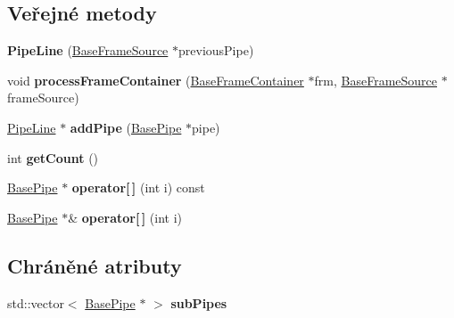 \subsection*{Veřejné metody}
\begin{DoxyCompactItemize}
\item 
\hypertarget{class_ar_pipe_1_1_pipe_line_ac60335c05ee67c4c1b87a66a3a612a90}{{\bfseries Pipe\-Line} (\hyperlink{class_ar_pipe_1_1_base_frame_source}{Base\-Frame\-Source} $\ast$previous\-Pipe)}\label{de/d52/class_ar_pipe_1_1_pipe_line_ac60335c05ee67c4c1b87a66a3a612a90}

\item 
\hypertarget{class_ar_pipe_1_1_pipe_line_a452bd2085e1702ae8c3a2b8a3985fc9e}{void {\bfseries process\-Frame\-Container} (\hyperlink{class_ar_pipe_1_1_base_frame_container}{Base\-Frame\-Container} $\ast$frm, \hyperlink{class_ar_pipe_1_1_base_frame_source}{Base\-Frame\-Source} $\ast$frame\-Source)}\label{de/d52/class_ar_pipe_1_1_pipe_line_a452bd2085e1702ae8c3a2b8a3985fc9e}

\item 
\hypertarget{class_ar_pipe_1_1_pipe_line_af5041e1c1ac8b0fa1f5a2dbaad5c0294}{\hyperlink{class_ar_pipe_1_1_pipe_line}{Pipe\-Line} $\ast$ {\bfseries add\-Pipe} (\hyperlink{class_ar_pipe_1_1_base_pipe}{Base\-Pipe} $\ast$pipe)}\label{de/d52/class_ar_pipe_1_1_pipe_line_af5041e1c1ac8b0fa1f5a2dbaad5c0294}

\item 
\hypertarget{class_ar_pipe_1_1_pipe_line_a6a5140894b8c3c185aee4ed9ada5bdaf}{int {\bfseries get\-Count} ()}\label{de/d52/class_ar_pipe_1_1_pipe_line_a6a5140894b8c3c185aee4ed9ada5bdaf}

\item 
\hypertarget{class_ar_pipe_1_1_pipe_line_a5443fdee418ed714bfc08adaef54c093}{\hyperlink{class_ar_pipe_1_1_base_pipe}{Base\-Pipe} $\ast$ {\bfseries operator\mbox{[}$\,$\mbox{]}} (int i) const }\label{de/d52/class_ar_pipe_1_1_pipe_line_a5443fdee418ed714bfc08adaef54c093}

\item 
\hypertarget{class_ar_pipe_1_1_pipe_line_a5bd71d6d682f5c7ace3444122e66efce}{\hyperlink{class_ar_pipe_1_1_base_pipe}{Base\-Pipe} $\ast$\& {\bfseries operator\mbox{[}$\,$\mbox{]}} (int i)}\label{de/d52/class_ar_pipe_1_1_pipe_line_a5bd71d6d682f5c7ace3444122e66efce}

\end{DoxyCompactItemize}
\subsection*{Chráněné atributy}
\begin{DoxyCompactItemize}
\item 
\hypertarget{class_ar_pipe_1_1_pipe_line_a9e945633806868296d7fa8e1ef59e580}{std\-::vector$<$ \hyperlink{class_ar_pipe_1_1_base_pipe}{Base\-Pipe} $\ast$ $>$ {\bfseries sub\-Pipes}}\label{de/d52/class_ar_pipe_1_1_pipe_line_a9e945633806868296d7fa8e1ef59e580}

\end{DoxyCompactItemize}
